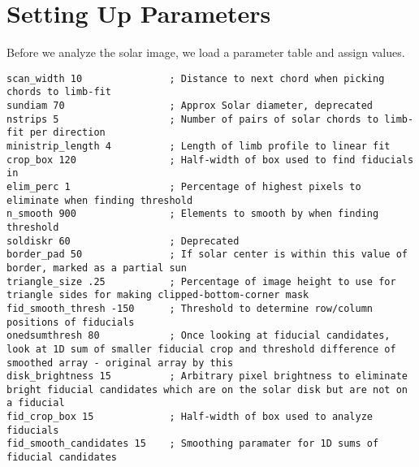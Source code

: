 \documentclass[10pt]{scrartcl}
\begin{document}

\section{Setting Up Parameters} %
\label{sec:setting_up_parameters}
Before we analyze the solar image, we load a parameter table and assign values. 
\begin{lstlisting}
scan_width 10               ; Distance to next chord when picking chords to limb-fit
sundiam 70                  ; Approx Solar diameter, deprecated
nstrips 5                   ; Number of pairs of solar chords to limb-fit per direction
ministrip_length 4          ; Length of limb profile to linear fit
crop_box 120                ; Half-width of box used to find fiducials in
elim_perc 1                 ; Percentage of highest pixels to eliminate when finding threshold
n_smooth 900                ; Elements to smooth by when finding threshold 
soldiskr 60                 ; Deprecated
border_pad 50               ; If solar center is within this value of border, marked as a partial sun
triangle_size .25           ; Percentage of image height to use for triangle sides for making clipped-bottom-corner mask
fid_smooth_thresh -150      ; Threshold to determine row/column positions of fiducials
onedsumthresh 80            ; Once looking at fiducial candidates, look at 1D sum of smaller fiducial crop and threshold difference of smoothed array - original array by this
disk_brightness 15          ; Arbitrary pixel brightness to eliminate bright fiducial candidates which are on the solar disk but are not on a fiducial
fid_crop_box 15             ; Half-width of box used to analyze fiducials
fid_smooth_candidates 15    ; Smoothing paramater for 1D sums of fiducial candidates 
\end{lstlisting}

\end{document}
